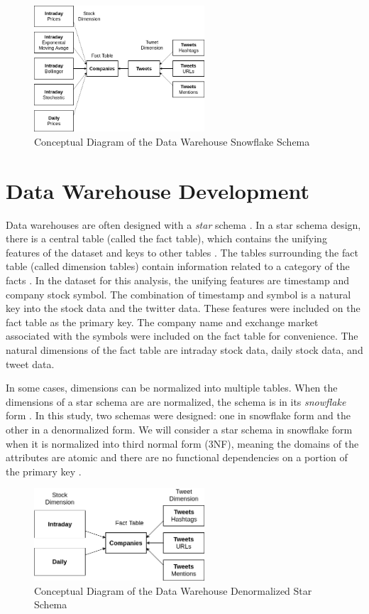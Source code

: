 \documentclass[journal]{IEEEtran}
\begin{document}
\begin{figure}
	\centering
	\includegraphics[width=2.5in]{SnowFlake_Schema_Simple.png}
	\caption{Conceptual Diagram of the Data Warehouse Snowflake Schema}
	\label{snowflake}
\end{figure}

\section{Data Warehouse Development}
\label{DataWarehouseDevelopment}

Data warehouses are often designed with a \textit{star} schema 
 \cite{BuildingtheDWCH11}.
In a star schema design, there is a central table (called the fact table),
 which contains the unifying features of the dataset and keys to other tables
 \cite{BuildingtheDWCH11}.
The tables surrounding the fact table (called dimension tables) 
 contain information related to a category of the facts \cite{Enterprise}.
In the dataset for this analysis, the unifying features are timestamp and
 company stock symbol.
The combination of timestamp and symbol is a natural key into the stock data and
 the twitter data.
These features were included on the fact table as the primary key.
The company name and exchange market associated with the symbols were 
 included on the fact table for convenience.
The natural dimensions of the fact table are intraday stock data,
 daily stock data, and tweet data.

In some cases, dimensions can be normalized into multiple tables. 
When the dimensions of a star schema are are normalized, the schema
 is in its \textit{snowflake} form \cite{WarehouseDesignApproaches}.
In this study, two schemas were designed: one in snowflake form and
 the other in a denormalized form.
We will consider a star schema in snowflake form when it is normalized into
 third normal form (3NF), meaning the domains of the attributes are atomic and
 there are no functional dependencies on a portion of the primary key \cite{DSCNormalization}.


\begin{figure}
	\centering
	\includegraphics[width=2.5in]{Star_Schema_Simple.png}
	\caption{Conceptual Diagram of the Data Warehouse 
		Denormalized Star Schema}
	\label{star}
\end{figure}
\end{document}
